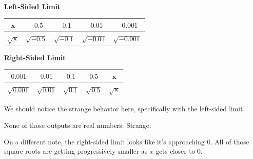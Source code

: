 \textbf{Left-Sided Limit}

\begin{tabular}{ccccc} \toprule
  $\bm{x}$ & $-0.5$ & $-0.1$ & $-0.01$ & $-0.001$ \\ \midrule
  $\bm{\sqrt{x}}$ & $\sqrt{-0.5}$ & $\sqrt{-0.1}$ & $\sqrt{-0.01}$ & $\sqrt{-0.001}$\\ \bottomrule
\end{tabular}

\begin{flushright}
  \textbf{Right-Sided Limit}

  \begin{tabular}{ccccc} \toprule
    $0.001$ & $0.01$ & $0.1$ & $0.5$ & $\bm{x}$ \\ \midrule
    $\sqrt{0.001}$ & $\sqrt{0.01}$ & $\sqrt{0.1}$ & $\sqrt{0.5}$ & $\bm{\sqrt{x}}$ \\ \bottomrule
  \end{tabular}
\end{flushright}

We should notice the strange behavior here, specifically with the left-sided limit.

None of those outputs are real numbers.
Strange.

On a different note, the right-sided limit looks like it's approaching 0.
All of those square roots are getting progressively smaller as $x$ gets closer to 0.
